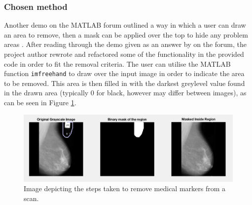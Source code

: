 \vspace{-4.3mm}
\subsubsection{Chosen method}

Another demo on the MATLAB forum outlined a way in which a user can draw an area to remove, then a mask can be applied over the top to hide any problem areas \cite{binary_mask}. After reading through the demo given as an answer by  on the forum, the project author rewrote and refactored some of the functionality in the provided code in order to fit the removal criteria. The user can utilise the MATLAB function \texttt{imfreehand} \cite{imfreehand} to draw over the input image in order to indicate the area to be removed. This area is then filled in with the darkest greylevel value found in the drawn area (typically 0 for black, however may differ between images), as can be seen in Figure \ref{fig:remove-marker}.

\begin{figure}[H]
  \centering
  \includegraphics[scale=0.3]{Chapter2/technical-img/draw-to-remove.png}
  \caption{Image depicting the steps taken to remove medical markers from a scan.}
  \label{fig:remove-marker}
\end{figure}
